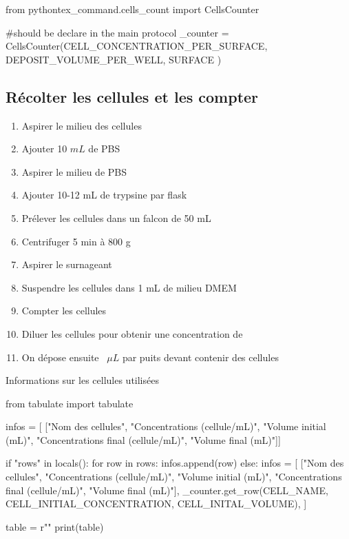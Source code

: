 \begin{pycode}

from pythontex_command.cells_count import CellsCounter

#should be declare in the main protocol 
_counter = CellsCounter(CELL_CONCENTRATION_PER_SURFACE,
                       DEPOSIT_VOLUME_PER_WELL,
                       SURFACE )

\end{pycode}



\subsection{Récolter les cellules et les compter}

\begin{enumerate}
\item Aspirer le milieu des cellules
\item Ajouter 10 $mL$ de PBS
\item Aspirer le milieu de PBS
\item Ajouter 10-12 mL de trypsine par flask
\item Prélever les cellules dans un falcon de 50 mL
\item Centrifuger 5 min à 800 g
\item Aspirer le surnageant 
\item Suspendre les cellules dans 1 mL de milieu DMEM
\item Compter les cellules
\item Diluer les cellules pour obtenir une concentration de 
\item On dépose ensuite ~$\mu L$ par puits devant contenir des cellules
\end{enumerate}

\begin{table}[h]
\caption{Informations sur les cellules utilisées}
\begin{pycode}

from tabulate import tabulate

infos = [
    ["Nom des cellules", "Concentrations (cellule/mL)", "Volume initial (mL)", "Concentrations final (cellule/mL)", "Volume final (mL)"]]
    
if "rows" in locals():
    for row in rows:
        infos.append(row)
else:   
    infos = [
    ["Nom des cellules", "Concentrations (cellule/mL)", "Volume initial (mL)", "Concentrations final (cellule/mL)", "Volume final (mL)"],
    _counter.get_row(CELL_NAME, CELL_INITIAL_CONCENTRATION, CELL_INITAL_VOLUME),
]

table = r""
print(table)
\end{pycode}
\label{table-comptage-cellules}
\end{table}